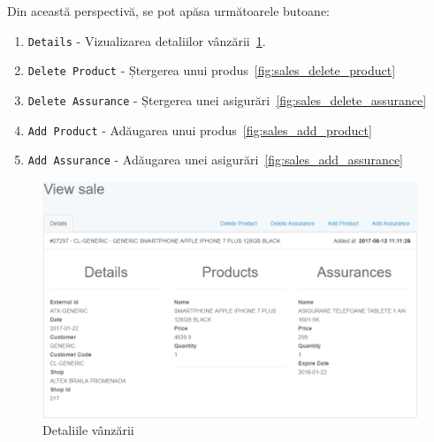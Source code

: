 			Din această perspectivă, se pot apăsa următoarele butoane:
			\begin{enumerate}
				\item \verb|Details| - Vizualizarea detaliilor vânzării~\ref{fig:sales_view}.
				\item \verb|Delete Product| - Ștergerea unui produs~\ref{fig:sales_delete_product}
				\item \verb|Delete Assurance| - Ștergerea unei asigurări~\ref{fig:sales_delete_assurance}
				\item \verb|Add Product| - Adăugarea unui produs~\ref{fig:sales_add_product}
				\item \verb|Add Assurance| - Adăugarea unei asigurări~\ref{fig:sales_add_assurance}
			\end{enumerate}
		\begin{figure}
			\includegraphics[width=\linewidth]{../imagini/sales_view.png}
			\caption{Detaliile vânzării}
			\label{fig:sales_view}
		\end{figure}
